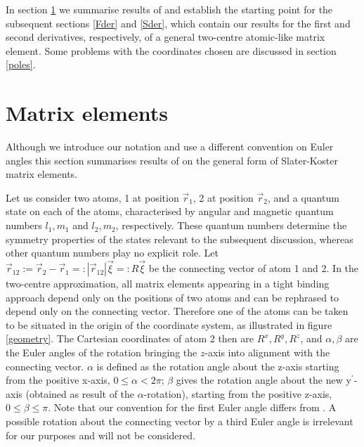 \par{In section \ref{ME} we summarise results of \citep{Podolskiy04}
and establish the starting point for the subsequent
sections \ref{Fder} and \ref{Sder}, which contain our results for the first and second derivatives,
respectively, of a general two-centre atomic-like matrix element. Some problems with the coordinates
chosen are discussed in section \ref{poles}.   }
%
%
\section{Matrix elements}
\label{ME}
%
\par{Although we introduce our notation and use a different convention on Euler
angles this section summarises results
of \citep{Podolskiy04} on the general form of Slater-Koster matrix elements.}
\par{Let us consider two atoms, 1 at position $\vec{r}_{1}$, 2 at position $\vec{r}_{2}$, and a quantum
state on each of the atoms, characterised by angular and magnetic quantum numbers \(l_1,m_1\)
and \(l_2,m_2\), respectively. These quantum numbers determine the
symmetry properties of the states relevant to the subsequent discussion, whereas other quantum numbers play
no explicit role.
Let $\vec{r}_{12}:=\vec{r}_{2}-\vec{r}_{1}=:|\vec{r}_{12}|\vec{\xi}=:R\vec{\xi}$ be
the connecting vector of atom 1 and 2. In the two-centre approximation, all matrix elements appearing in
a tight binding approach depend only on the positions of two atoms and can be rephrased to depend only
on the connecting vector. Therefore one of the atoms can be taken to be situated in the origin of
the coordinate system, as illustrated in figure \ref{geometry}. The Cartesian coordinates of
atom 2 then are
\(R^x,R^y,R^z\), and $\alpha,\beta$ are the Euler angles of the rotation bringing the $z$-axis into
alignment with the connecting vector. $\alpha$ is defined as the
rotation angle about the z-axis starting from the positive x-axis, $0\le\alpha<2\pi$; $\beta$ gives the
rotation angle about the new y$^{\prime}$-axis (obtained as result of the $\alpha$-rotation),
starting from the positive z-axis, $0\le\beta\le\pi$. Note that our convention for the first Euler angle
differs from \citep{Podolskiy04}. A possible rotation about the connecting vector by a third Euler angle is
irrelevant for our purposes and will not be considered. }
%
